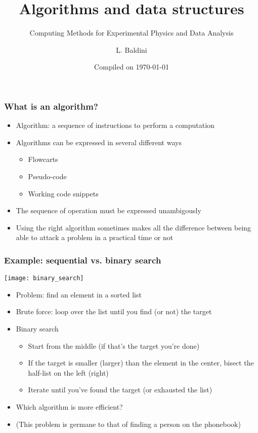 \documentclass[9pt]{beamer}
\title{Algorithms and data structures}
\subtitle{Computing Methods for Experimental Physics and Data Analysis}
\date{Compiled on \today}
\author{L. Baldini}
\institute[UNIPI and INFN]{Universit\`a and INFN--Pisa}
\begin{document}
\titleframe


\begin{frame}
  \frametitle{What is an algorithm?}
  \begin{itemize}
  \item \alert{Algorithm}: a sequence of instructions to perform a computation
  \item Algorithms can be expressed in several different ways
    \begin{itemize}
    \item Flowcarts
    \item Pseudo-code
    \item Working code snippets
    \end{itemize}
  \item The sequence of operation must be expressed unambigously
  \item \alert{Using the right algorithm sometimes makes all the difference
    between being able to attack a problem in a practical time or not}
  \end{itemize}
\end{frame}

\begin{frame}
  \frametitle{Example: sequential vs. binary search}
  \centering\texttt{[image: binary\_search]}

  \bigskip

  \begin{itemize}
  \item Problem: find an element in a sorted list
  \item \alert{Brute force}: loop over the list until you find (or not) the
    target
  \item \alert{Binary search}
    \begin{itemize}
    \item Start from the middle (if that's the target you're done)
    \item If the target is smaller (larger) than the element in the center,
      bisect the half-list on the left (right)
    \item Iterate until you've found the target (or exhausted the list)
    \end{itemize}
  \item Which algorithm is more efficient?
  \item (This problem is germane to that of finding a person on the phonebook)
  \end{itemize}
\end{frame}
\end{document}
